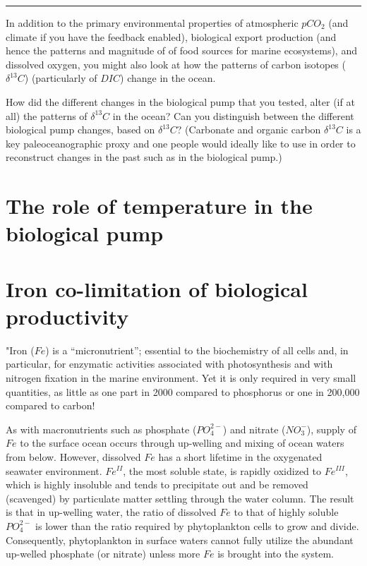 \documentclass[11pt,fleqn]{book} %
\begin{document}
\vspace{-1mm}
\noindent\rule{4cm}{0.5pt}
\vspace{2mm}

\noindent In addition to the primary environmental properties of atmospheric \(pCO_{2}\) (and climate if you have the feedback enabled), biological export production (and hence the patterns and magnitude of of food sources for marine ecosystems), and dissolved oxygen, you might also look at how the patterns of carbon isotopes (\(\delta^{13}C\)) (particularly of \(DIC\)) change in the ocean. 

How did the different changes in the biological pump that you tested, alter (if at all) the patterns of \(\delta^{13}C\) in the ocean? Can you distinguish between the different biological pump changes, based on \(\delta^{13}C\)? (Carbonate and organic carbon \(\delta^{13}C\) is a key paleoceanographic proxy and one people would ideally like to use in order to reconstruct changes in the past such as in the biological pump.)


\newpage


\section{The role of temperature in the biological pump}


\newpage


\section{Iron co-limitation of biological productivity}

"Iron (\(Fe\)) is a “micronutrient”; essential to the biochemistry of all cells and, in particular, for enzymatic activities associated with photosynthesis and with nitrogen fixation in the marine environment. Yet it is only required in very small quantities, as little as one part in 2000 compared to phosphorus
or one in 200,000 compared to carbon! 

As with macronutrients such as phosphate (\(PO^{2-}_{4}\)) and nitrate (\(NO^{-}_{3}\)), supply of \(Fe\) to the surface ocean occurs through up-welling and mixing of ocean waters from below. However, dissolved \(Fe\) has a short lifetime in the oxygenated seawater environment. \(Fe^{II}\), the most soluble state, is rapidly oxidized to \(Fe^{III}\), which is highly insoluble and tends to precipitate out and be removed (scavenged) by particulate matter settling through the water column. The result is that in up-welling water, the ratio of dissolved \(Fe\) to that of highly soluble \(PO^{2-}_{4}\) is lower than the ratio required by phytoplankton cells to grow and divide. Consequently, phytoplankton in surface waters cannot fully utilize the abundant up-welled
phosphate (or nitrate) unless more \(Fe\) is brought into the system.
\end{document}
